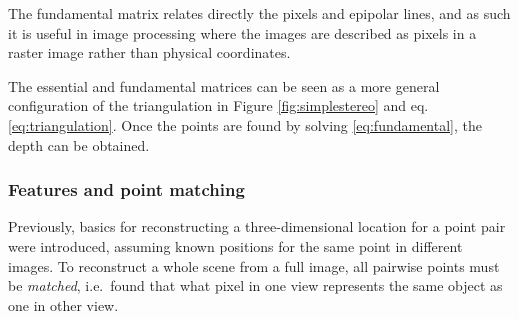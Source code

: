 The fundamental matrix relates directly the pixels and epipolar lines, and as such it is useful in image processing where the images are described as pixels in a raster image rather than physical coordinates.


%


The essential and fundamental matrices can be seen as a more general configuration of the triangulation in Figure \ref{fig:simplestereo} and eq. \ref{eq:triangulation}.
Once the points are found by solving \ref{eq:fundamental}, the depth can be obtained.



\subsubsection{Features and point matching} %


Previously, basics for reconstructing a three-dimensional location for a point pair were introduced, assuming known positions for the same point in different images.
To reconstruct a whole scene from a full image, all pairwise points must be \emph{matched}, i.e.\ found that what pixel in one view represents the same object as one in other view.

